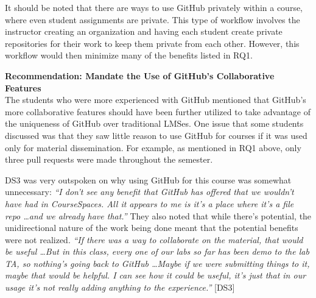 

It should be noted that there are ways to use GitHub privately within a course, where even student assignments are private. This type of workflow involves the instructor creating an organization and having each student create private repositories for their work to keep them private from each other. However, this workflow would then minimize many of the benefits listed in RQ1.

\textbf{Recommendation: Mandate the Use of GitHub's Collaborative Features} \\
The students who were more experienced with GitHub mentioned that GitHub's more collaborative features should have been further utilized to take advantage of the uniqueness of GitHub over traditional LMSes. One issue that some students discussed was that they saw little reason to use GitHub for courses if it was used only for material dissemination. For example, as mentioned in RQ1 above, only three pull requests were made throughout the semester.

DS3 was very outspoken on why using GitHub for this course was somewhat unnecessary: \textit{``I don't see any benefit that GitHub has offered that we wouldn't have had in CourseSpaces. All it appears to me is it's a place where it's a file repo \ldots and we already have that.''} They also noted that while there's potential, the unidirectional nature of the work being done meant that the potential benefits were not realized. \textit{``If there was a way to collaborate on the material, that would be useful \ldots But in this class, every one of our labs so far has been demo to the lab TA, so nothing's going back to GitHub \ldots Maybe if we were submitting things to it, maybe that would be helpful. I can see how it could be useful, it's just that in our usage it's not really adding anything to the experience.''} [DS3] %


